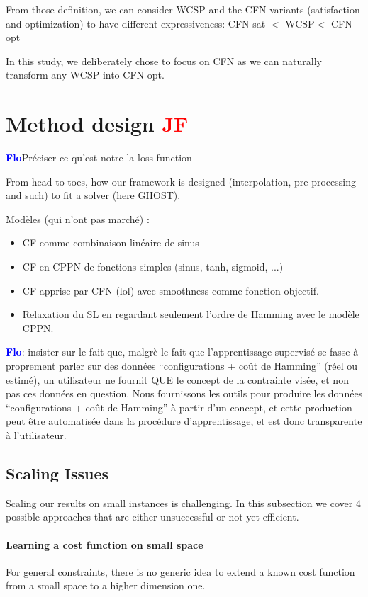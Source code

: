 \documentclass{article}
\newcommand{\cfn}{\textsc{CFN}\xspace}
\newcommand{\wcsp}{\textsc{WCSP}\xspace}
\newcommand{\flo}{\textcolor{blue}{\bf Flo}\xspace}
\newcommand{\jf}{\textcolor{red}{\bf JF}\xspace}
\begin{document}
From those  definition, we  can consider \wcsp  and the  \cfn variants
(satisfaction  and  optimization)  to have  different  expressiveness:
\cfn-sat $<$ \wcsp $<$ \cfn-opt

In  this study,  we deliberately  chose  to focus  on \cfn  as we  can
naturally transform any \wcsp into \cfn-opt.

\section{Method design \jf}\label{sec:method}
\flo{Préciser ce qu'est notre la loss function}

From  head to  toes,  how our  framework  is designed  (interpolation,
pre-processing and such) to fit a solver (here GHOST).

Modèles (qui n'ont pas marché) :
\begin{itemize}
\item CF comme combinaison linéaire de sinus
\item CF en CPPN de fonctions simples (sinus, tanh, sigmoid, ...)
\item CF apprise par CFN (lol) avec smoothness comme fonction objectif.
\item Relaxation du SL en regardant seulement l'ordre de Hamming avec le modèle CPPN.
\end{itemize}

\flo: insister  sur le  fait que, malgrè  le fait  que l'apprentissage
supervisé   se   fasse   à   proprement   parler   sur   des   données
``configurations + coût de Hamming''  (réel ou estimé), un utilisateur
ne  fournit QUE  le concept  de la  contrainte visée,  et non  pas ces
données en  question.  Nous fournissons  les outils pour  produire les
données ``configurations + coût de Hamming'' à partir d'un concept, et
cette   production   peut   être   automatisée   dans   la   procédure
d'apprentissage, et est donc transparente à l'utilisateur.

\subsection{Scaling Issues}\label{subsec:issues}
Scaling  our  results  on  small instances  is  challenging.  In  this
subsection we cover 4 possible approaches that are either unsuccessful
or not yet efficient.

\paragraph{Learning a cost function on small space}
For general constraints, there is no generic idea to extend a known cost
function from a small space to a higher dimension one.
\end{document}
